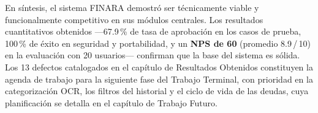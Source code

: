 \bigskip

En síntesis, el sistema FINARA demostró ser técnicamente viable y funcionalmente competitivo en sus módulos centrales. Los resultados cuantitativos obtenidos ---67.9\,\% de tasa de aprobación en los casos de prueba, 100\,\% de éxito en seguridad y portabilidad, y un \textbf{NPS de 60} (promedio 8.9\,/\,10) en la evaluación con 20 usuarios--- confirman que la base del sistema es sólida. Los 13 defectos catalogados en el capítulo de Resultados Obtenidos constituyen la agenda de trabajo para la siguiente fase del Trabajo Terminal, con prioridad en la categorización OCR, los filtros del historial y el ciclo de vida de las deudas, cuya planificación se detalla en el capítulo de Trabajo Futuro.
